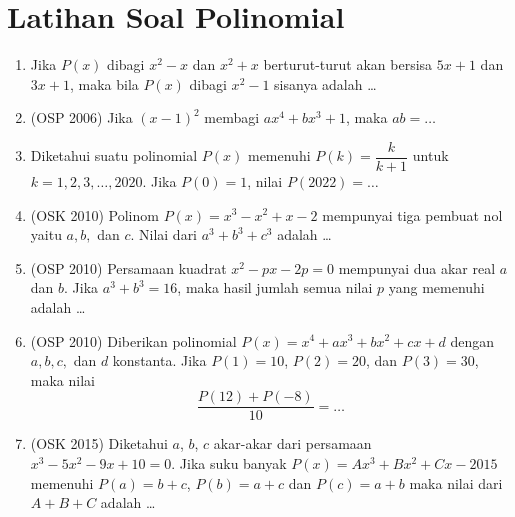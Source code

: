 \documentclass[a4paper]{article}
\begin{document}
\section{Latihan Soal Polinomial}
\begin{enumerate}

\item Jika $P(x)$ dibagi $x^2-x$ dan $x^2+x$ berturut-turut akan bersisa $5x+1$ dan $3x+1$, maka bila $P(x)$ dibagi $x^2-1$ sisanya adalah \dots

\item (OSP 2006) Jika $(x-1)^2$ membagi $ax^4+bx^3+1$, maka $ab=\dots$

\item Diketahui suatu polinomial $P(x)$ memenuhi $P(k)=\dfrac{k}{k+1}$ untuk $k=1,2,3,\dots,2020$. Jika $P(0)=1$, nilai $P(2022)=\dots$

\item (OSK 2010) Polinom $P(x)=x^3-x^2+x-2$ mempunyai tiga pembuat nol yaitu $a,b,$ dan $c$. Nilai dari $a^3+b^3+c^3$ adalah \dots

\item (OSP 2010) Persamaan kuadrat $x^2-px-2p=0$ mempunyai dua akar real $a$ dan $b$. Jika $a^3+b^3=16$, maka hasil jumlah semua nilai $p$ yang memenuhi adalah \dots 

\item (OSP 2010) Diberikan polinomial $P(x)=x^4+ax^3+bx^2+cx+d$ dengan $a,b,c,$ dan $d$ konstanta. Jika $P(1)=10$, $P(2)=20$, dan  $P(3)=30$, maka nilai
$$\dfrac{P(12)+P(-8)}{10}=\dots$$

\item (OSK 2015) Diketahui $a$, $b$, $c$ akar-akar dari persamaan $x^3 - 5x^2 - 9x + 10 = 0$. Jika suku banyak $P(x) = Ax^3 + Bx^2 + Cx - 2015$ memenuhi $P(a) = b + c$, $P(b) = a + c$ dan $P(c) = a + b$ maka nilai dari $A + B + C$ adalah \ldots

\end{enumerate}
\end{document}
